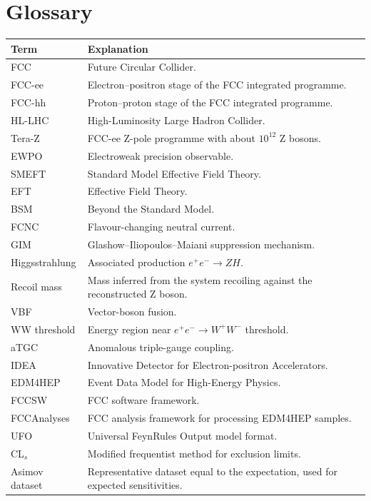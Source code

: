 \documentclass[11pt,a4paper]{report}
\newcommand{\ee}{e^+e^-}
\begin{document}
\chapter{Glossary}
\begin{longtable}{p{}p{}}
\toprule
Term & Explanation \\
\midrule
FCC & Future Circular Collider. \\
FCC-ee & Electron--positron stage of the FCC integrated programme. \\
FCC-hh & Proton--proton stage of the FCC integrated programme. \\
HL-LHC & High-Luminosity Large Hadron Collider. \\
Tera-Z & FCC-ee Z-pole programme with about $10^{12}$ Z bosons. \\
EWPO & Electroweak precision observable. \\
SMEFT & Standard Model Effective Field Theory. \\
EFT & Effective Field Theory. \\
BSM & Beyond the Standard Model. \\
FCNC & Flavour-changing neutral current. \\
GIM & Glashow--Iliopoulos--Maiani suppression mechanism. \\
Higgsstrahlung & Associated production $\ee\to ZH$. \\
Recoil mass & Mass inferred from the system recoiling against the reconstructed Z boson. \\
VBF & Vector-boson fusion. \\
WW threshold & Energy region near $\ee\to W^+W^-$ threshold. \\
aTGC & Anomalous triple-gauge coupling. \\
IDEA & Innovative Detector for Electron-positron Accelerators. \\
EDM4HEP & Event Data Model for High-Energy Physics. \\
FCCSW & FCC software framework. \\
FCCAnalyses & FCC analysis framework for processing EDM4HEP samples. \\
UFO & Universal FeynRules Output model format. \\
CL$_s$ & Modified frequentist method for exclusion limits. \\
Asimov dataset & Representative dataset equal to the expectation, used for expected sensitivities. \\
\bottomrule
\end{longtable}
\end{document}
